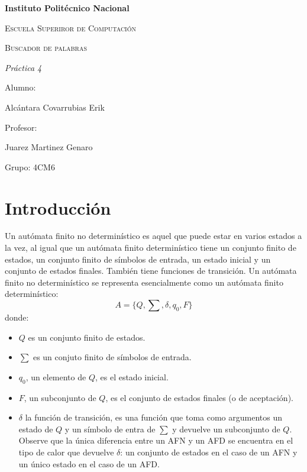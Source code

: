 \documentclass{article}
\begin{document}
\begin{titlepage}
\centering

{\bfseries\LARGE Instituto Polit\'ecnico Nacional \par}
\vspace{1cm}
{\scshape\Large Escuela Superiror de Computaci\'on \par}
\vspace{3cm}
{\scshape\Huge  Buscador de palabras \par}
\vspace{3cm}
{\itshape\Large Pr\'actica 4 \par}
\vfill
{\Large Alumno: \par}
{\Large Alcántara Covarrubias Erik\par}
{\Large Profesor: \par}
{\Large Juarez Martinez Genaro \par}
{\Large Grupo: 4CM6\par}
\vfill
\end{titlepage}

\section{Introducci\'on}

Un autómata finito no determinístico es aquel que puede estar en varios estados a la vez, al igual que un autómata finito determinístico tiene un conjunto finito de estados, un conjunto finito de símbolos de entrada, un estado inicial y un conjunto de estados finales. También tiene funciones de transición. \newline \newline
Un autómata finito no determinístico se representa esencialmente como un autómata finito determinístico:
\begin{equation}
A =\{Q,\sum,\delta,q_0,F\}
\end{equation}
donde:
\begin{itemize}
    \item $Q$ es un conjunto finito de estados.
    \item $\sum$ es un conjuto finito de símbolos de entrada.
    \item $q_0$, un elemento de $Q$, es el estado inicial.
    \item $F$, un subconjunto de $Q$, es el conjunto de estados finales (o de aceptación).
    \item $\delta$ la función de transición, es una función que toma como argumentos un estado de $Q$ y un símbolo de entra de $\sum$ y devuelve un subconjunto de $Q$. Observe que la única diferencia entre un AFN y un AFD se encuentra en el tipo de calor que devuelve $\delta$: un conjunto de estados en el caso de un AFN y un único estado en el caso de un AFD. 
\end{itemize}
\end{document}
